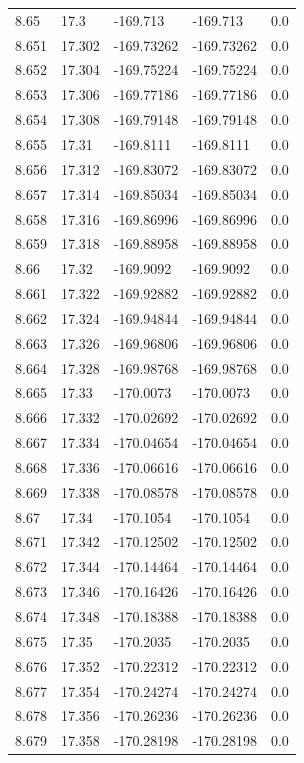 \begin{tabular}{lllll}
8.65 & 17.3 & -169.713 & -169.713 & 0.0 \\
8.651 & 17.302 & -169.73262 & -169.73262 & 0.0 \\
8.652 & 17.304 & -169.75224 & -169.75224 & 0.0 \\
8.653 & 17.306 & -169.77186 & -169.77186 & 0.0 \\
8.654 & 17.308 & -169.79148 & -169.79148 & 0.0 \\
8.655 & 17.31 & -169.8111 & -169.8111 & 0.0 \\
8.656 & 17.312 & -169.83072 & -169.83072 & 0.0 \\
8.657 & 17.314 & -169.85034 & -169.85034 & 0.0 \\
8.658 & 17.316 & -169.86996 & -169.86996 & 0.0 \\
8.659 & 17.318 & -169.88958 & -169.88958 & 0.0 \\
8.66 & 17.32 & -169.9092 & -169.9092 & 0.0 \\
8.661 & 17.322 & -169.92882 & -169.92882 & 0.0 \\
8.662 & 17.324 & -169.94844 & -169.94844 & 0.0 \\
8.663 & 17.326 & -169.96806 & -169.96806 & 0.0 \\
8.664 & 17.328 & -169.98768 & -169.98768 & 0.0 \\
8.665 & 17.33 & -170.0073 & -170.0073 & 0.0 \\
8.666 & 17.332 & -170.02692 & -170.02692 & 0.0 \\
8.667 & 17.334 & -170.04654 & -170.04654 & 0.0 \\
8.668 & 17.336 & -170.06616 & -170.06616 & 0.0 \\
8.669 & 17.338 & -170.08578 & -170.08578 & 0.0 \\
8.67 & 17.34 & -170.1054 & -170.1054 & 0.0 \\
8.671 & 17.342 & -170.12502 & -170.12502 & 0.0 \\
8.672 & 17.344 & -170.14464 & -170.14464 & 0.0 \\
8.673 & 17.346 & -170.16426 & -170.16426 & 0.0 \\
8.674 & 17.348 & -170.18388 & -170.18388 & 0.0 \\
8.675 & 17.35 & -170.2035 & -170.2035 & 0.0 \\
8.676 & 17.352 & -170.22312 & -170.22312 & 0.0 \\
8.677 & 17.354 & -170.24274 & -170.24274 & 0.0 \\
8.678 & 17.356 & -170.26236 & -170.26236 & 0.0 \\
8.679 & 17.358 & -170.28198 & -170.28198 & 0.0 \\

\end{tabular}
